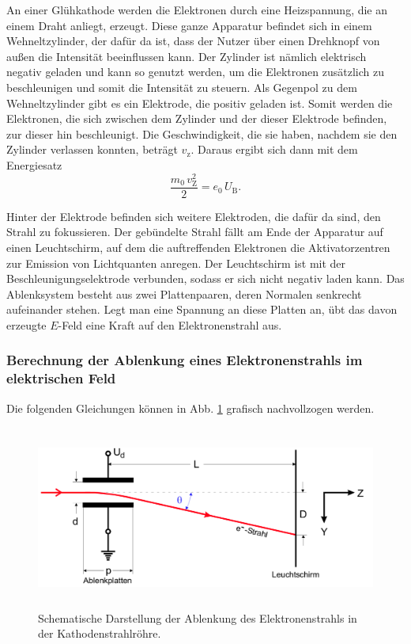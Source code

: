 \noindent An einer Glühkathode werden die Elektronen durch eine Heizspannung, die an einem Draht anliegt, erzeugt.  
Diese ganze Apparatur befindet sich in einem Wehneltzylinder, der dafür da ist, dass der Nutzer über einen Drehknopf von außen die Intensität beeinflussen kann. Der Zylinder ist nämlich elektrisch negativ geladen und kann so genutzt werden, um die Elektronen zusätzlich zu beschleunigen und somit die Intensität zu steuern. 
Als Gegenpol zu dem Wehneltzylinder gibt es ein Elektrode, die positiv geladen ist. Somit werden die Elektronen, die sich zwischen dem Zylinder und der dieser Elektrode befinden, zur dieser hin beschleunigt. Die Geschwindigkeit, die sie haben, nachdem sie den Zylinder verlassen konnten, beträgt $v_\text{z}$.  
Daraus ergibt sich dann mit dem Energiesatz  
\begin{equation}
    \frac{m_0 \, v_\text{Z}^2}{2} = e_\text{0} \, U_\text{B}.
    \label{eqn:energie}
\end{equation}

\noindent Hinter der Elektrode befinden sich weitere Elektroden, 
die dafür da sind, den Strahl zu fokussieren. Der gebündelte 
Strahl fällt am Ende der Apparatur auf einen Leuchtschirm, 
auf dem die auftreffenden Elektronen die Aktivatorzentren zur 
Emission von Lichtquanten anregen.
Der Leuchtschirm ist mit der Beschleunigungselektrode 
verbunden, sodass er sich nicht negativ laden kann.
Das Ablenksystem besteht aus zwei Plattenpaaren, deren Normalen 
senkrecht aufeinander stehen. Legt man eine Spannung an diese 
Platten an, übt das davon erzeugte $E$-Feld eine Kraft 
auf den Elektronenstrahl aus. 

\subsubsection{Berechnung der Ablenkung eines Elektronenstrahls im elektrischen Feld} %
Die folgenden Gleichungen können in Abb. \ref{fig:roehre2}
grafisch nachvollzogen werden.
\begin{figure}
    \centering
    \includegraphics[width=12cm, height=6cm]{build/roehre2.png}
    \caption{Schematische Darstellung der Ablenkung des
    Elektronenstrahls in der Kathodenstrahlröhre. \cite{V501}}
    \label{fig:roehre2}
\end{figure}

